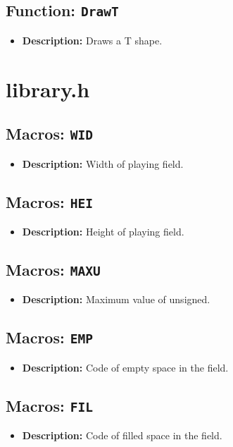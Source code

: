 \documentclass{article}
\begin{document}
\subsection{Function: \texttt{DrawT}}
\begin{itemize}
    \item \textbf{Description:} Draws a T shape.
\end{itemize}

\section{library.h}
\subsection{Macros: \texttt{WID}}
\begin{itemize}
    \item \textbf{Description:} Width of playing field.
\end{itemize}

\subsection{Macros: \texttt{HEI}}
\begin{itemize}
    \item \textbf{Description:} Height of playing field.
\end{itemize}

\subsection{Macros: \texttt{MAXU}}
\begin{itemize}
    \item \textbf{Description:} Maximum value of unsigned.
\end{itemize}

\subsection{Macros: \texttt{EMP}}
\begin{itemize}
    \item \textbf{Description:} Code of empty space in the field.
\end{itemize}

\subsection{Macros: \texttt{FIL}}
\begin{itemize}
    \item \textbf{Description:} Code of filled space in the field.
\end{itemize}
\end{document}
